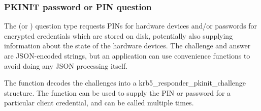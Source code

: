 \documentclass[letterpaper,10pt,english]{sphinxmanual}
\begin{document}
\subsubsection{PKINIT password or PIN question}
\label{appdev/init_creds:pkinit-password-or-pin-question}
The  (or ) question
type requests PINs for hardware devices and/or passwords for encrypted
credentials which are stored on disk, potentially also supplying
information about the state of the hardware devices.  The challenge and
answer are JSON-encoded strings, but an application can use convenience
functions to avoid doing any JSON processing itself.

The {\hyperref[appdev/refs/api/krb5_responder_pkinit_get_challenge:krb5_responder_pkinit_get_challenge]{}} function decodes the
challenges into a krb5\_responder\_pkinit\_challenge structure.  The
{\hyperref[appdev/refs/api/krb5_responder_pkinit_set_answer:krb5_responder_pkinit_set_answer]{}} function can be used to
supply the PIN or password for a particular client credential, and can
be called multiple times.
\end{document}
